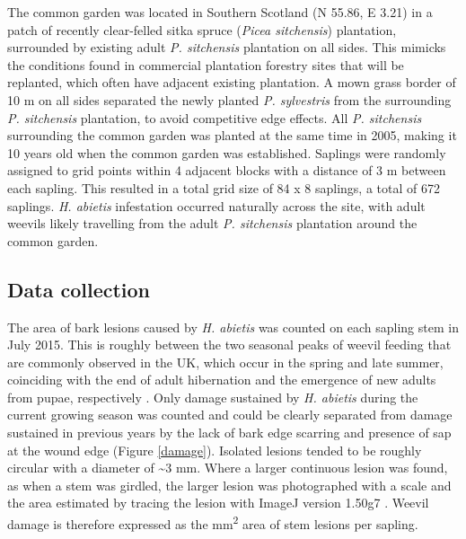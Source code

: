 \documentclass[a4paper, 11pt]{article}
\newcommand{\todo}[1]{\textcolor{red}{#1}}   %
\begin{document}
The common garden was located in Southern Scotland (N 55.86\textdegree{}, E \textminus{}3.21\textdegree{}) in a patch of recently clear-felled sitka spruce (\textit{Picea sitchensis}) plantation, surrounded by existing adult \textit{P. sitchensis} plantation on all sides. This mimicks the conditions found in commercial plantation forestry sites that will be replanted, which often have adjacent existing plantation. A mown grass border of 10 m on all sides separated the newly planted \textit{P. sylvestris} from the surrounding \textit{P. sitchensis} plantation, to avoid competitive edge effects. All \textit{P. sitchensis} surrounding the common garden was planted at the same time in 2005, making it 10 years old when the common garden was established. %
Saplings were randomly assigned to grid points within 4 adjacent blocks with a distance of 3 m between each sapling. This resulted in a total grid size of 84 x 8 saplings, a total of 672 saplings. \textit{H. abietis} infestation occurred naturally across the site, with adult weevils likely travelling from the adult \textit{P. sitchensis} plantation around the common garden. 

\subsection*{Data collection}

The area of bark lesions caused by \textit{H. abietis} was counted on each sapling stem in July 2015. This is roughly between the two seasonal peaks of weevil feeding that are commonly observed in the UK, which occur in the spring and late summer, coinciding with the end of adult hibernation and the emergence of new adults from pupae, respectively \citep{Nordenhem1989, Leather1999}. Only damage sustained by \textit{H. abietis} during the current growing season was counted and could be clearly separated from damage sustained in previous years by the lack of bark edge scarring and presence of sap at the wound edge (Figure \ref{damage}). Isolated lesions tended to be roughly circular with a diameter of \textasciitilde{}3 mm. Where a larger continuous lesion was found, as when a stem was girdled, the larger lesion was photographed with a scale and the area estimated by tracing the lesion with ImageJ version 1.50g7 \citep{Schneider2012}. Weevil damage is therefore expressed as the mm\textsuperscript{2} area of stem lesions per sapling. 
\end{document}
